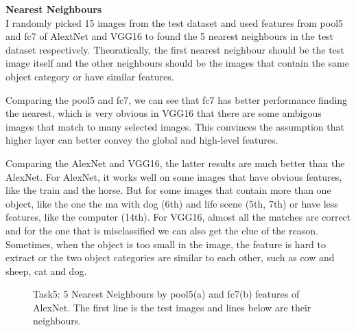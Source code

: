 \documentclass[12pt]{report}
\begin{document}
\begin{outline}
\textbf{Nearest Neighbours}\\

I randomly picked 15 images from the test dataset and used features from pool5 and fc7 of AlextNet and VGG16 to found the 5 nearest neighbours in the test dataset respectively. Theoratically, the first nearest neighbour should be the test image itself and the other neighbours should be the images that contain the same object category or have similar features.

Comparing the pool5 and fc7, we can see that fc7 has better performance finding the nearest, which is very obvious in VGG16 that there are some ambigous images that match to many selected images. This convinces the assumption that higher layer can better convey the global and high-level features.

Comparing the AlexNet and VGG16, the latter results are much better than the AlexNet. For AlexNet, it works well on some images that have obvious features, like the train and the horse. But for some images that contain more than one object, like the one the ma with dog (6th) and life scene (5th, 7th) or have less features, like the computer (14th). For VGG16, almost all the matches are correct and for the one that is misclassified we can also get the clue of the reason. Sometimes, when the object is too small in the image, the feature is hard to extract or the two object categories are similar to each other, such as cow and sheep, cat and dog.\\

\begin{figure}[!h]
  \centering
  \caption{Task5: 5 Nearest Neighbours by pool5(a) and fc7(b) features of AlexNet. The first line is the test images and lines below are their neighbours.}
\label{fig:short}
\end{figure}


\end{outline}
\end{document}
